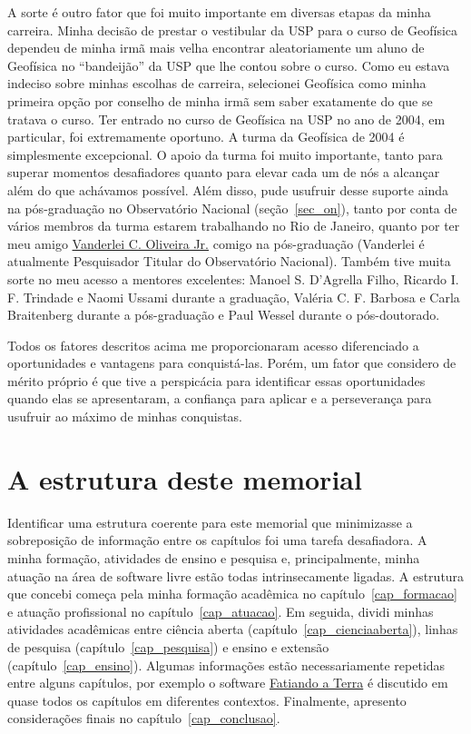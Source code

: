 \documentclass[10pt,a4paper,oneside]{book}
\begin{document}
A sorte é outro fator que foi muito importante em diversas etapas da minha
carreira.
Minha decisão de prestar o vestibular da USP para o curso de Geofísica dependeu
de minha irmã mais velha encontrar aleatoriamente um aluno de Geofísica no
``bandeijão'' da USP que lhe contou sobre o curso.
Como eu estava indeciso sobre minhas escolhas de carreira, selecionei Geofísica
como minha primeira opção por conselho de minha irmã sem saber exatamente do
que se tratava o curso.
Ter entrado no curso de Geofísica na USP no ano de 2004, em particular, foi
extremamente oportuno.
A turma da Geofísica de 2004 é simplesmente excepcional.
O apoio da turma foi muito importante, tanto para superar momentos desafiadores
quanto para elevar cada um de nós a alcançar além do que achávamos possível.
Além disso, pude usufruir desse suporte ainda na pós-graduação no Observatório
Nacional (seção~\ref{sec_on}), tanto por conta de vários membros da turma
estarem trabalhando no Rio de Janeiro, quanto por ter meu amigo
\href{https://www.pinga-lab.org/people/oliveira-jr.html}{Vanderlei C. Oliveira Jr.}
comigo na pós-graduação (Vanderlei é atualmente Pesquisador Titular do
Observatório Nacional).
Também tive muita sorte no meu acesso a mentores excelentes:
Manoel S. D'Agrella Filho, Ricardo I. F. Trindade e Naomi Ussami
durante a graduação, Valéria C. F. Barbosa e Carla Braitenberg durante a
pós-graduação e Paul Wessel durante o pós-doutorado.

Todos os fatores descritos acima me proporcionaram acesso diferenciado a
oportunidades e vantagens para conquistá-las.
Porém, um fator que considero de mérito próprio é que tive a perspicácia para
identificar essas oportunidades quando elas se apresentaram, a confiança para
aplicar e a perseverança para usufruir ao máximo de minhas conquistas.

\section{A estrutura deste memorial}

Identificar uma estrutura coerente  para este memorial que minimizasse a
sobreposição de informação entre os capítulos foi uma tarefa desafiadora.
A minha formação, atividades de ensino e pesquisa e, principalmente, minha
atuação na área de software livre estão todas intrinsecamente ligadas.
A estrutura que concebi começa pela minha formação acadêmica no
capítulo~\ref{cap_formacao} e atuação profissional no
capítulo~\ref{cap_atuacao}.
Em seguida, dividi minhas atividades acadêmicas
entre ciência aberta (capítulo~\ref{cap_cienciaaberta}),
linhas de pesquisa (capítulo~\ref{cap_pesquisa})
e ensino e extensão (capítulo~\ref{cap_ensino}).
Algumas informações estão necessariamente repetidas entre alguns capítulos,
por exemplo o software \href{https://www.fatiando.org}{Fatiando a Terra}
é discutido em quase todos os capítulos em diferentes contextos.
Finalmente, apresento considerações finais no capítulo~\ref{cap_conclusao}.
\end{document}

